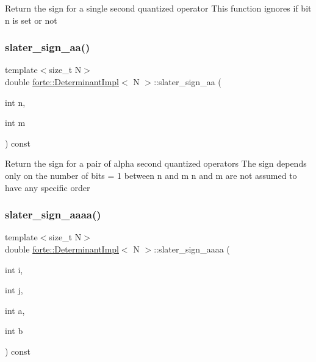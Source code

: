 Return the sign for a single second quantized operator This function ignores if bit n is set or not \mbox{\label{classforte_1_1_determinant_impl_abb5dee18e8891364cc6f60f282e5a7f8}} 
\subsubsection{\texorpdfstring{slater\+\_\+sign\+\_\+aa()}{slater\_sign\_aa()}}
{\footnotesize\ttfamily template$<$size\+\_\+t N$>$ \\
double \mbox{\hyperlink{classforte_1_1_determinant_impl}{forte\+::\+Determinant\+Impl}}$<$ N $>$\+::slater\+\_\+sign\+\_\+aa (\begin{DoxyParamCaption}\item[{int}]{n,  }\item[{int}]{m }\end{DoxyParamCaption}) const\hspace{0.3cm}{\ttfamily [inline]}}

Return the sign for a pair of alpha second quantized operators The sign depends only on the number of bits = 1 between n and m n and m are not assumed to have any specific order \mbox{\label{classforte_1_1_determinant_impl_ab1855ca2b1feed1b3733a36c7be64429}} 
\subsubsection{\texorpdfstring{slater\+\_\+sign\+\_\+aaaa()}{slater\_sign\_aaaa()}}
{\footnotesize\ttfamily template$<$size\+\_\+t N$>$ \\
double \mbox{\hyperlink{classforte_1_1_determinant_impl}{forte\+::\+Determinant\+Impl}}$<$ N $>$\+::slater\+\_\+sign\+\_\+aaaa (\begin{DoxyParamCaption}\item[{int}]{i,  }\item[{int}]{j,  }\item[{int}]{a,  }\item[{int}]{b }\end{DoxyParamCaption}) const\hspace{0.3cm}{\ttfamily [inline]}}

